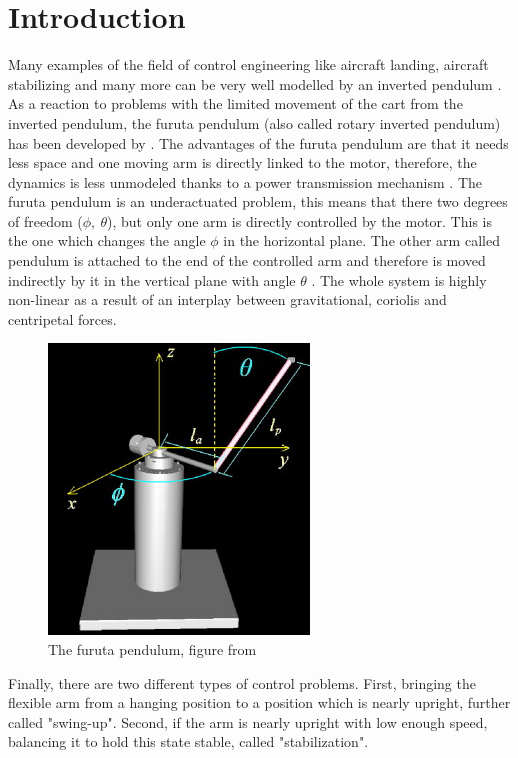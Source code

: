\section{Introduction}
Many examples of the field of control engineering like aircraft landing, 
aircraft stabilizing and many more can be very well modelled by an inverted 
pendulum \cite{akhtaruzzaman2010modeling}. As a reaction to problems with the 
limited movement of the cart from 
the inverted pendulum, the furuta pendulum (also called rotary inverted 
pendulum) 
has been developed by 
\citeauthor{furuta1992swing}. The advantages of the furuta pendulum are that it 
needs less space and one moving arm is directly linked to the motor, therefore, 
the dynamics is less unmodeled thanks to a power transmission mechanism 
\cite{furuta1992swing}. The furuta pendulum is an underactuated problem, this 
means that there two degrees of freedom ($\phi,\ \theta$), 
but only one arm is directly controlled by the motor. This is the one which 
changes the angle $\phi$ in the horizontal plane. The other arm called pendulum 
is attached to 
the end of the controlled arm and therefore is moved indirectly by it in the 
vertical plane with angle $\theta$ 
\cite{spong1998underactuated,tedrake2009underactuated}. The whole system is 
highly non-linear as a result of an interplay between gravitational, coriolis 
and centripetal forces.
\begin{figure}[h]
	\centering
	\includegraphics[width=0.5\linewidth]{pendulum}
	\caption{The furuta pendulum, figure from \cite{la2009new}}
	\label{fig:pendulum}
\end{figure}
Finally, there are two different types of control problems. First, bringing the 
flexible arm from a hanging position to a position which is nearly upright, 
further called "swing-up". Second, if the arm is nearly upright with low enough 
speed, balancing it to hold this state stable, called "stabilization". 
